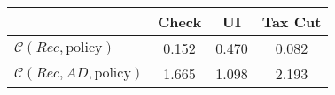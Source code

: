 \begin{tabular}{@{}lccc@{}} 
\toprule 
                          & Check      & UI    & Tax Cut    \\  \midrule 
$\mathcal{C}(Rec,\text{policy})$ & 0.152  & 0.470  & 0.082     \\ 
$\mathcal{C}(Rec, AD,\text{policy})$ & 1.665  & 1.098  & 2.193     \\ 
\end{tabular}  
